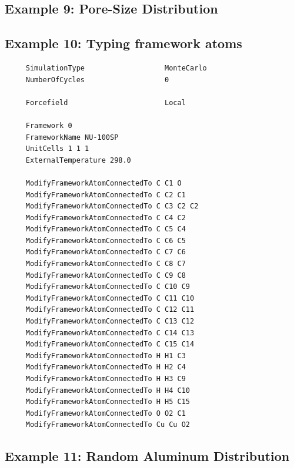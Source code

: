 \subsection*{Example 9: Pore-Size Distribution}

\subsection*{Example 10: Typing framework atoms}

\begin{tiny}
\begin{verbatim}
     SimulationType                   MonteCarlo
     NumberOfCycles                   0
     
     Forcefield                       Local
     
     Framework 0
     FrameworkName NU-100SP
     UnitCells 1 1 1
     ExternalTemperature 298.0
     
     ModifyFrameworkAtomConnectedTo C C1 O
     ModifyFrameworkAtomConnectedTo C C2 C1
     ModifyFrameworkAtomConnectedTo C C3 C2 C2
     ModifyFrameworkAtomConnectedTo C C4 C2
     ModifyFrameworkAtomConnectedTo C C5 C4
     ModifyFrameworkAtomConnectedTo C C6 C5
     ModifyFrameworkAtomConnectedTo C C7 C6
     ModifyFrameworkAtomConnectedTo C C8 C7
     ModifyFrameworkAtomConnectedTo C C9 C8
     ModifyFrameworkAtomConnectedTo C C10 C9
     ModifyFrameworkAtomConnectedTo C C11 C10
     ModifyFrameworkAtomConnectedTo C C12 C11
     ModifyFrameworkAtomConnectedTo C C13 C12
     ModifyFrameworkAtomConnectedTo C C14 C13
     ModifyFrameworkAtomConnectedTo C C15 C14
     ModifyFrameworkAtomConnectedTo H H1 C3
     ModifyFrameworkAtomConnectedTo H H2 C4
     ModifyFrameworkAtomConnectedTo H H3 C9
     ModifyFrameworkAtomConnectedTo H H4 C10
     ModifyFrameworkAtomConnectedTo H H5 C15
     ModifyFrameworkAtomConnectedTo O O2 C1
     ModifyFrameworkAtomConnectedTo Cu Cu O2
\end{verbatim}
\end{tiny}

\subsection*{Example 11: Random Aluminum Distribution}

